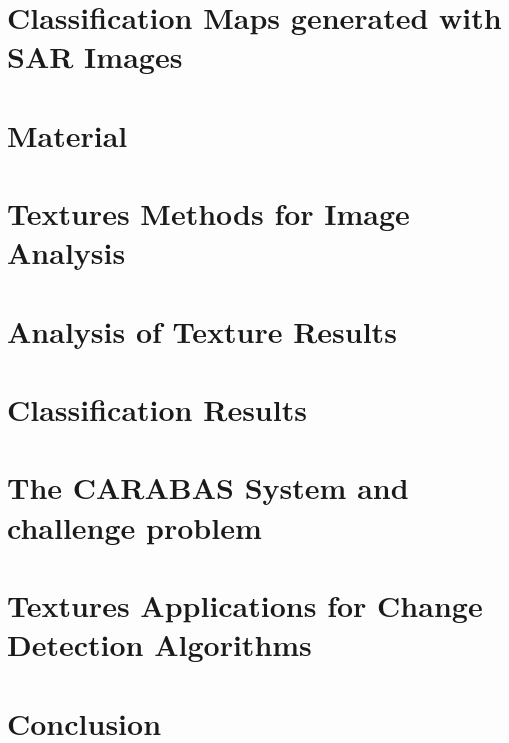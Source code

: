 \documentclass[msc, eng]{ita}    %
\begin{document}
\chapter{Classification Maps generated with SAR Images}
\label{cap:requisitos}


\chapter{Material}
\label{cap:material rondonia}


\chapter{Textures Methods for Image Analysis}
\label{cap:texture_methods}


\chapter{Analysis of Texture Results}
\label{cap:analysis_texture_results}


\chapter{Classification Results}
\label{cap:classification_results}




\chapter{The CARABAS System and challenge problem}
\label{cap:carabas_chapter}


\chapter{Textures Applications for Change Detection Algorithms}
\label{cap:cda_chapter}


\chapter{Conclusion}
\label{cap:conclusion}


% 
\end{document}
